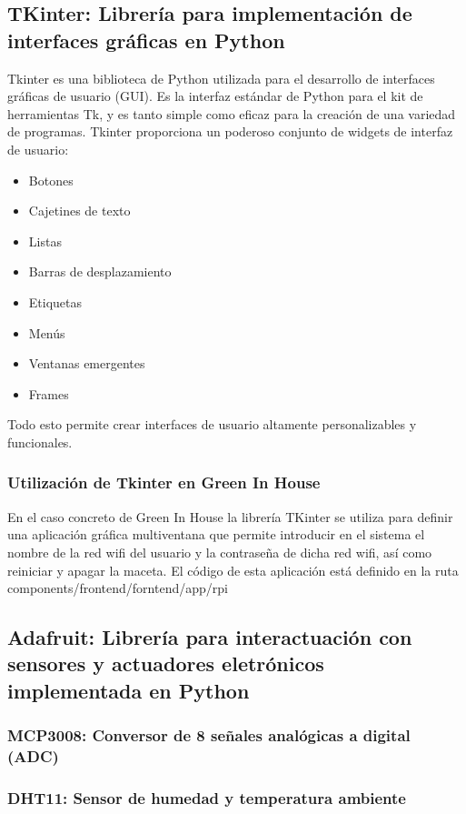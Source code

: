     \subsection{TKinter:  Librería para implementación de interfaces gráficas en Python}
    Tkinter es una biblioteca de Python utilizada para el desarrollo de interfaces gráficas de usuario (GUI). Es la interfaz estándar de Python para el kit de herramientas Tk, y es tanto simple como eficaz para la creación de una variedad de programas. Tkinter proporciona un poderoso conjunto de widgets de interfaz de usuario:
    \begin{itemize}
        \item Botones
        \item Cajetines de texto
        \item Listas
        \item Barras de desplazamiento
        \item Etiquetas
        \item Menús 
        \item Ventanas emergentes
        \item Frames
    \end{itemize}
    Todo esto permite crear interfaces de usuario altamente personalizables y funcionales.    
        \subsubsection{Utilización de Tkinter en Green In House}
        En el caso concreto de Green In House la librería TKinter se utiliza para definir una aplicación gráfica multiventana que permite introducir en el sistema el nombre de la red wifi del usuario y la contraseña de dicha red wifi, así como reiniciar y apagar la maceta.
        El código de esta aplicación está definido en la ruta components/frontend/forntend/app/rpi

    \subsection{Adafruit: Librería para interactuación con sensores y actuadores eletrónicos implementada en Python}
    
       \subsubsection{MCP3008: Conversor de 8 señales analógicas a digital (ADC)}
    
    
        \subsubsection{DHT11: Sensor de humedad y temperatura ambiente}
    

